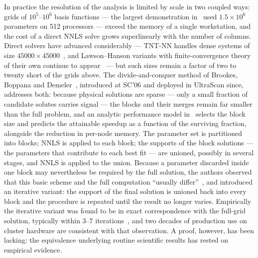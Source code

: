 \documentclass[pdflatex,sn-mathphys-num]{sn-jnl}
\theoremstyle{thmstyleone}
\theoremstyle{thmstyletwo}
\begin{document}
In practice the resolution of the analysis is limited by scale in two
coupled ways: grids of $10^{5}$--$10^{6}$ basis functions --- the
largest demonstration in~\cite{brookes2006} used $1.5\times10^{6}$
parameters on 512 processors --- exceed the memory of a single workstation, and the cost of a direct
NNLS solve grows superlinearly with the number of columns. Direct solvers have
advanced considerably --- TNT-NN handles dense systems of size
$45000\times45000$~\cite{myre2017}, and Lawson--Hanson variants with
finite-convergence theory of their own continue to
appear~\cite{dessole2023} --- but such sizes remain a factor of two to
twenty short of the grids above. The divide-and-conquer
method of Brookes, Boppana and Demeler~\cite{brookes2006}, introduced
at SC'06 and deployed in UltraScan since, addresses both: because
physical solutions are sparse --- only a small fraction of candidate
solutes carries signal --- the blocks and their merges remain far
smaller than the full problem, and an analytic performance model
in~\cite{brookes2006} selects the block size and predicts the
attainable speedup as a function of the surviving fraction, alongside
the reduction in per-node memory. The
parameter set is partitioned into blocks; NNLS is applied to each block;
the supports of the block solutions --- the parameters that contribute to
each best fit --- are unioned, possibly in several stages, and NNLS is
applied to the union. Because a parameter discarded inside one block may
nevertheless be required by the full solution, the authors observed that
this basic scheme and the full computation ``usually
differ''~\cite{brookes2006}, and introduced an iterative variant: the
support of the final solution is unioned back into every block and the
procedure is repeated until the result no longer varies. Empirically the
iterative variant was found to be in exact correspondence with the
full-grid solution, typically within 3--7 iterations~\cite{brookes2006}, and
two decades of production use on cluster hardware are consistent with
that observation. A proof, however, has been lacking: the equivalence
underlying routine scientific results has rested on empirical evidence.
\end{document}
